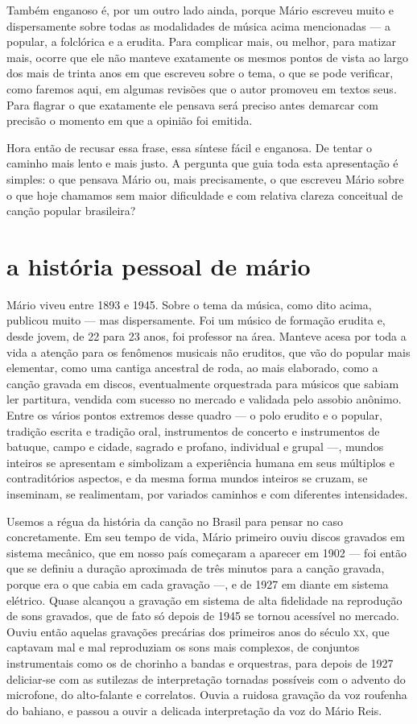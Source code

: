 Também enganoso é, por um outro lado ainda, porque Mário escreveu muito
e dispersamente sobre todas as modalidades de música acima mencionadas
--- a popular, a folclórica e a erudita. Para complicar mais,
ou melhor, para matizar mais, ocorre que ele não manteve exatamente os
mesmos pontos de vista ao largo dos mais de trinta anos em que escreveu
sobre o tema, o que se pode verificar, como faremos aqui, em algumas
revisões que o autor promoveu em textos seus. Para flagrar o que
exatamente ele pensava será preciso antes demarcar com precisão o
momento em que a opinião foi emitida.

Hora então de recusar essa frase, essa síntese fácil e enganosa. De
tentar o caminho mais lento e mais justo. A pergunta que guia toda esta
apresentação é simples: o que pensava Mário ou, mais precisamente, o que
escreveu Mário sobre o que hoje chamamos sem maior dificuldade e com
relativa clareza conceitual de canção popular brasileira?

\section{a história pessoal de mário}

Mário viveu entre 1893 e 1945. Sobre o tema da música, como dito
acima, publicou muito --- mas dispersamente. Foi um músico de formação erudita
e, desde jovem, de 22 para 23 anos, foi professor na área. 
Manteve acesa por toda a vida a atenção para os fenômenos musicais
não eruditos, que vão do popular mais elementar, como uma cantiga
ancestral de roda, ao mais elaborado, como a canção gravada em discos,
eventualmente orquestrada para músicos que sabiam ler partitura, vendida
com sucesso no mercado e validada pelo assobio anônimo. Entre os vários
pontos extremos desse quadro --- o polo erudito e o popular, tradição
escrita e tradição oral, instrumentos de concerto e instrumentos de
batuque, campo e cidade, sagrado e profano, individual e grupal ---,
mundos inteiros se apresentam e simbolizam a experiência humana em seus
múltiplos e contraditórios aspectos, e da mesma forma mundos inteiros se
cruzam, se inseminam, se realimentam, por variados caminhos e com
diferentes intensidades.

Usemos a régua da história da canção no Brasil para pensar no caso
concretamente. Em seu tempo de vida, Mário primeiro ouviu discos
gravados em sistema mecânico, que em nosso país começaram a aparecer em
1902 --- foi então que se definiu a duração aproximada de três minutos para
a canção gravada, porque era o que cabia em cada gravação ---, e de 1927
em diante em sistema elétrico. Quase alcançou a gravação em sistema de
alta fidelidade na reprodução de sons gravados, que de fato só depois de
1945 se tornou acessível no mercado. Ouviu então aquelas gravações
precárias dos primeiros anos do século \textsc{xx}, que captavam mal e mal
reproduziam os sons mais complexos, de conjuntos instrumentais como os
de chorinho a bandas e orquestras, para depois de 1927 deliciar-se com as
sutilezas de interpretação tornadas possíveis com o advento do
microfone, do alto-falante e correlatos. Ouvia a ruidosa gravação da voz
roufenha do bahiano, e passou a ouvir a delicada interpretação da voz do
Mário Reis.

